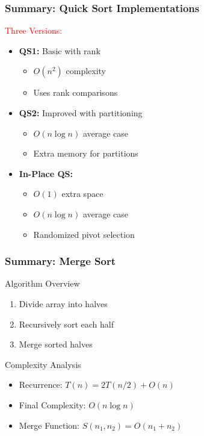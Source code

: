\begin{frame}
    \frametitle{Summary: Quick Sort Implementations}
    \begin{block}{\textcolor{red}{Three Versions:}}
        \begin{itemize}
            \item \textbf{QS1:} Basic with rank
            \begin{itemize}
                \item $O(n^2)$ complexity
                \item Uses rank comparisons
            \end{itemize}
            \vspace{0.2cm}
            \item \textbf{QS2:} Improved with partitioning
            \begin{itemize}
                \item $O(n \log n)$ average case
                \item Extra memory for partitions
            \end{itemize}
            \vspace{0.2cm}
            \item \textbf{In-Place QS:}
            \begin{itemize}
                \item $O(1)$ extra space
                \item $O(n \log n)$ average case
                \item Randomized pivot selection
            \end{itemize}
        \end{itemize}
    \end{block}
\end{frame}

\begin{frame}
    \frametitle{Summary: Merge Sort}
    \begin{block}{Algorithm Overview}
        \begin{enumerate}
            \item Divide array into halves
            \item Recursively sort each half
            \item Merge sorted halves
        \end{enumerate}
    \end{block}
    
    \begin{alertblock}{Complexity Analysis}
        \begin{itemize}
            \item Recurrence: $T(n) = 2T(n/2) + O(n)$
            \item Final Complexity: $O(n \log n)$
            \item Merge Function: $S(n_1, n_2) = O(n_1 + n_2)$
        \end{itemize}
    \end{alertblock}
\end{frame}

